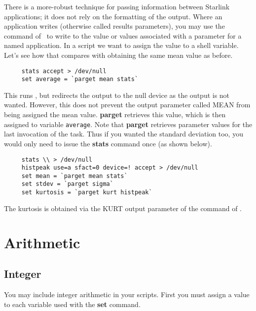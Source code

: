 There is a more-robust technique for passing information between
Starlink applications; it does not rely on the formatting of the
output. Where an application writes  (otherwise called results parameters), you
may use the  command of \KAPPAref\ to
write to  the value or
values associated with a parameter for a named application. In a
script we want to assign the value to a shell variable.  Let's see how
that compares with obtaining the same mean value as before.

\small
\begin{verbatim}
     stats accept > /dev/null
     set average = `parget mean stats`
\end{verbatim}
\normalsize
This runs , but redirects the output
to the null device as the output is not wanted.  However, this does
not prevent the output parameter called MEAN from being assigned the
mean value.  {\bf parget} retrieves this value, which is then assigned
to variable {\tt average}.  Note that {\bf parget} retrieves parameter
values for the last invocation of the task.  Thus if you wanted the
standard deviation too, you would only need to issue the {\bf stats}
command once (as shown below).

\small
\begin{verbatim}
     stats \\ > /dev/null
     histpeak use=a sfact=0 device=! accept > /dev/null
     set mean = `parget mean stats`
     set stdev = `parget sigma`
     set kurtosis = `parget kurt histpeak`
\end{verbatim}
\normalsize
The kurtosis is obtained via the KURT output parameter of the  command of \ESPref.

\newpage
\section{Arithmetic\label{sc4_se_csharith}}

\subsection{Integer\label{sc4_se_integer}}

You may include integer arithmetic in your scripts.  First you must
assign a value to each variable used with the {\bf set} command.

